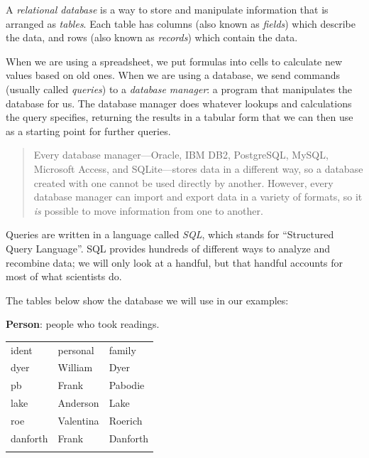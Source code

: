 \documentclass[]{book}
\newcommand{\gdef}[2]{\emph{#2}}
\begin{document}
A \gdef{g:relational-database}{relational database} is a way to
store and manipulate information that is arranged as
\gdef{g:table-database}{tables}. Each table has columns (also known
as \gdef{g:field-database}{fields}) which describe the data, and
rows (also known as \gdef{g:record-database}{records}) which contain
the data.

When we are using a spreadsheet, we put formulas into cells to calculate
new values based on old ones. When we are using a database, we send
commands (usually called \gdef{g:query}{queries}) to a
\gdef{g:database-manager}{database manager}: a program that
manipulates the database for us. The database manager does whatever
lookups and calculations the query specifies, returning the results in a
tabular form that we can then use as a starting point for further
queries.

\begin{quote}
Every database manager---Oracle, IBM DB2, PostgreSQL, MySQL, Microsoft
Access, and SQLite---stores data in a different way, so a database
created with one cannot be used directly by another. However, every
database manager can import and export data in a variety of formats, so
it \emph{is} possible to move information from one to another.
\end{quote}

Queries are written in a language called \gdef{g:sql}{SQL}, which
stands for ``Structured Query Language''. SQL provides hundreds of
different ways to analyze and recombine data; we will only look at a
handful, but that handful accounts for most of what scientists do.

The tables below show the database we will use in our examples:

\textbf{Person}: people who took readings.

\begin{longtable}[c]{@{}lll@{}}
\hline\noalign{\medskip}
ident & personal & family
\\\noalign{\medskip}
\hline\noalign{\medskip}
dyer & William & Dyer
\\\noalign{\medskip}
pb & Frank & Pabodie
\\\noalign{\medskip}
lake & Anderson & Lake
\\\noalign{\medskip}
roe & Valentina & Roerich
\\\noalign{\medskip}
danforth & Frank & Danforth
\\\noalign{\medskip}
\hline
\end{longtable}
\end{document}
